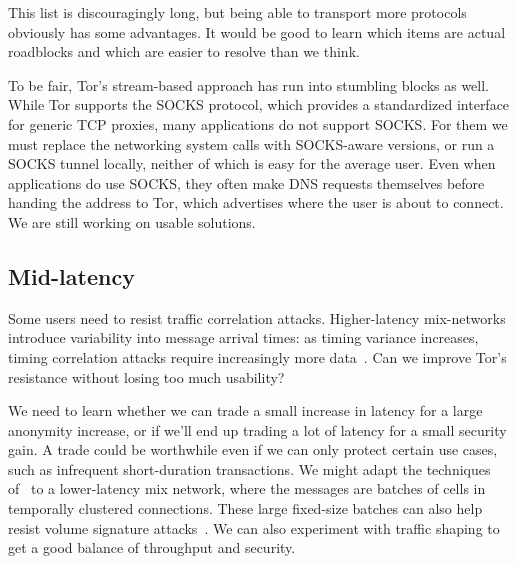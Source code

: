 \documentclass{llncs}
\begin{document}
This list is discouragingly long, but being able to transport more
protocols obviously has some advantages. It would be good to learn which
items are actual roadblocks and which are easier to resolve than we think.

To be fair, Tor's stream-based approach has run into
stumbling blocks as well. While Tor supports the SOCKS protocol,
which provides a standardized interface for generic TCP proxies, many
applications do not support SOCKS\@. For them we must
replace the networking system calls with SOCKS-aware
versions, or run a SOCKS tunnel locally, neither of which is
easy for the average user. %
Even when applications do use SOCKS, they often make DNS requests
themselves before handing the address to Tor, which advertises
where the user is about to connect.
We are still working on usable solutions.


\subsection{Mid-latency}
\label{subsec:mid-latency}

Some users need to resist traffic correlation attacks.  Higher-latency
mix-networks introduce variability into message
arrival times: as timing variance increases, timing correlation attacks
require increasingly more data~\cite{e2e-traffic}. Can we improve Tor's
resistance without losing too much usability?

We need to learn whether we can trade a small increase in latency
for a large anonymity increase, or if we'll end up trading a lot of
latency for a small security gain. A trade could be worthwhile even if we
can only protect certain use cases, such as infrequent short-duration
transactions. %
We might adapt the techniques of~\cite{e2e-traffic} to a lower-latency mix
network, where the messages are batches of cells in temporally clustered
connections. These large fixed-size batches can also help resist volume
signature attacks~\cite{hintz-pet02}. We can also experiment with traffic
shaping to get a good balance of throughput and security.
\end{document}
